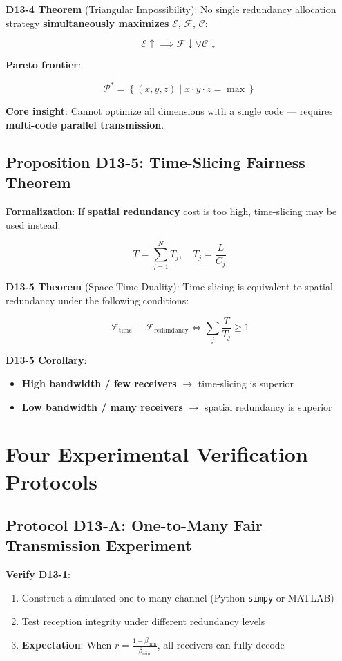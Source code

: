 \documentclass[12pt,a4paper]{article}
\newcommand{\calF}{\mathcal{F}}
\newcommand{\calE}{\mathcal{E}}
\newcommand{\calC}{\mathcal{C}}
\newcommand{\calFtime}{\mathcal{F}_{\text{time}}}
\newcommand{\calFred}{\mathcal{F}_{\text{redundancy}}}
\newcommand{\betamin}{\beta_{\min}}
\newcommand{\calPstar}{\mathcal{P}^*}
\begin{document}
\textbf{D13-4 Theorem} (Triangular Impossibility): No single redundancy allocation strategy \textbf{simultaneously maximizes} $\calE$, $\calF$, $\calC$:

$$\calE \uparrow \implies \calF \downarrow \lor \calC \downarrow$$

\textbf{Pareto frontier}:

$$\calPstar = \left\{(x, y, z) \mid x \cdot y \cdot z = \max\right\}$$

\textbf{Core insight}: Cannot optimize all dimensions with a single code --- requires \textbf{multi-code parallel transmission}.

\subsection{Proposition D13-5: Time-Slicing Fairness Theorem}

\textbf{Formalization}: If \textbf{spatial redundancy} cost is too high, time-slicing may be used instead:

$$T = \sum_{j=1}^{N} T_j, \quad T_j = \frac{L}{C_j}$$

\textbf{D13-5 Theorem} (Space-Time Duality): Time-slicing is equivalent to spatial redundancy under the following conditions:

$$\calFtime \equiv \calFred \iff \sum_{j} \frac{T}{T_j} \geq 1$$

\textbf{D13-5 Corollary}:
\begin{itemize}
    \item \textbf{High bandwidth / few receivers} $\rightarrow$ time-slicing is superior
    \item \textbf{Low bandwidth / many receivers} $\rightarrow$ spatial redundancy is superior
\end{itemize}

\section{Four Experimental Verification Protocols}

\subsection{Protocol D13-A: One-to-Many Fair Transmission Experiment}

\textbf{Verify D13-1}:
\begin{enumerate}
    \item Construct a simulated one-to-many channel (Python \texttt{simpy} or MATLAB)
    \item Test reception integrity under different redundancy levels
    \item \textbf{Expectation}: When $r = \frac{1-\betamin}{\betamin}$, all receivers can fully decode
\end{enumerate}
\end{document}
